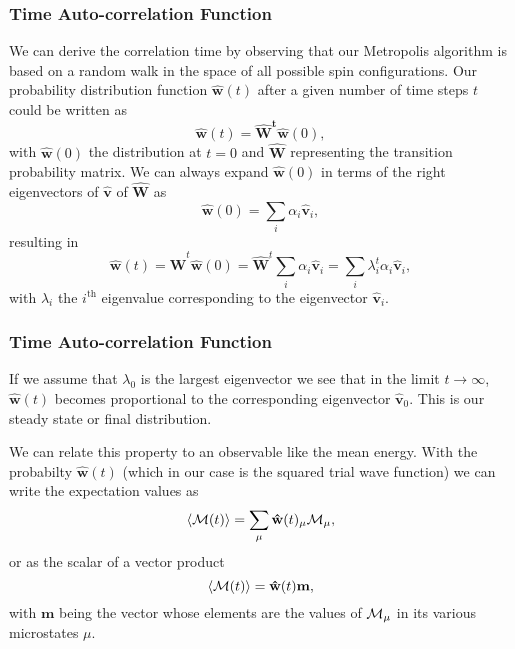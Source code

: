 \documentclass{beamer}
\begin{document}
\begin{frame}
\frametitle{Time Auto-correlation Function}

\begin{block}{}
We can derive the correlation time by observing that our Metropolis algorithm is based on a random
walk in the space of all  possible spin configurations. 
Our probability 
distribution function $\mathbf{\hat{w}}(t)$ after a given number of time steps $t$ could be written as
\[
   \mathbf{\hat{w}}(t) = \mathbf{\hat{W}^t\hat{w}}(0),
\]
with $\mathbf{\hat{w}}(0)$ the distribution at $t=0$ and $\mathbf{\hat{W}}$ representing the 
transition probability matrix. 
We can always expand $\mathbf{\hat{w}}(0)$ in terms of the right eigenvectors of 
$\mathbf{\hat{v}}$ of $\mathbf{\hat{W}}$ as 
\[
    \mathbf{\hat{w}}(0)  = \sum_i\alpha_i\mathbf{\hat{v}}_i,
\]
resulting in 
\[
   \mathbf{\hat{w}}(t) = \mathbf{\hat{W}}^t\mathbf{\hat{w}}(0)=\mathbf{\hat{W}}^t\sum_i\alpha_i\mathbf{\hat{v}}_i=
\sum_i\lambda_i^t\alpha_i\mathbf{\hat{v}}_i,
\]
with $\lambda_i$ the $i^{\mathrm{th}}$ eigenvalue corresponding to  
the eigenvector $\mathbf{\hat{v}}_i$. 
\end{block}
\end{frame}

\begin{frame}
\frametitle{Time Auto-correlation Function}

\begin{block}{}
If we assume that $\lambda_0$ is the largest eigenvector we see that in the limit $t\rightarrow \infty$,
$\mathbf{\hat{w}}(t)$ becomes proportional to the corresponding eigenvector 
$\mathbf{\hat{v}}_0$. This is our steady state or final distribution. 

We can relate this property to an observable like the mean energy.
With the probabilty $\mathbf{\hat{w}}(t)$ (which in our case is the squared trial wave function) we
can write the expectation values as 
\[
 \langle {\cal M}(t) \rangle  = \sum_{\mu} \mathbf{\hat{w}}(t)_{\mu}{\cal M}_{\mu},
\] 
or as the scalar of a  vector product
 \[
 \langle {\cal M}(t) \rangle  = \mathbf{\hat{w}}(t)\mathbf{m},
\] 
with $\mathbf{m}$ being the vector whose elements are the values of ${\cal M}_{\mu}$ in its 
various microstates $\mu$.
\end{block}
\end{frame}
\end{document}
